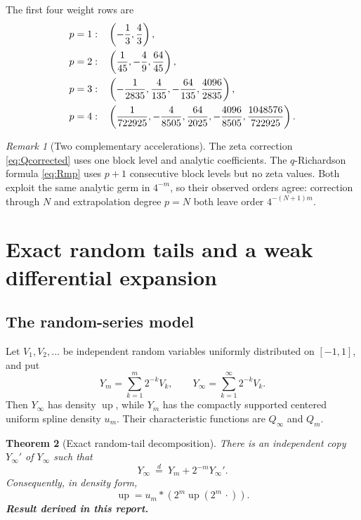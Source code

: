 \documentclass[11pt,oneside]{article}
\numberwithin{equation}{section}
\newtheorem{theorem}{Theorem}[section]
\theoremstyle{definition}
\theoremstyle{remark}
\newtheorem{remark}[theorem]{Remark}
\newcommand{\Up}{\operatorname{up}}
\newcommand{\newresult}{\textbf{Result derived in this report.}}
\begin{document}
The first four weight rows are
\begin{align}
 p=1:&\quad \left(-\frac13,\frac43\right),\notag\\
 p=2:&\quad \left(\frac1{45},-\frac49,\frac{64}{45}\right),\notag\\
 p=3:&\quad \left(-\frac1{2835},\frac4{135},-\frac{64}{135},\frac{4096}{2835}\right),
 \label{eq:weights-first}\\
 p=4:&\quad \left(\frac1{722925},-\frac4{8505},\frac{64}{2025},
 -\frac{4096}{8505},\frac{1048576}{722925}\right).\notag
\end{align}

\begin{remark}[Two complementary accelerations]
The zeta correction \eqref{eq:Qcorrected} uses one block level and analytic coefficients.
The $q$-Richardson formula \eqref{eq:Rmp} uses $p+1$ consecutive block levels but no zeta
values.  Both exploit the same analytic germ in $4^{-m}$, so their observed orders agree:
correction through $N$ and extrapolation degree $p=N$ both leave order $4^{-(N+1)m}$.
\end{remark}

\section{Exact random tails and a weak differential expansion}
\label{sec:probability}

\subsection{The random-series model}

Let $V_1,V_2,\ldots$ be independent random variables uniformly distributed on $[-1,1]$, and
put
\begin{equation}
 Y_m=\sum_{k=1}^{m}2^{-k}V_k,
 \qquad
 Y_\infty=\sum_{k=1}^{\infty}2^{-k}V_k.
 \label{eq:Ydef}
\end{equation}
Then $Y_\infty$ has density $\Up$, while $Y_m$ has the compactly supported centered uniform
spline density $u_m$.  Their characteristic functions are $Q_\infty$ and $Q_m$.

\begin{theorem}[Exact random-tail decomposition]
\label{thm:random-tail}
There is an independent copy $Y_\infty'$ of $Y_\infty$ such that
\begin{equation}
 \boxed{Y_\infty\ \stackrel{d}{=}\ Y_m+2^{-m}Y_\infty'.}
 \label{eq:random-tail}
\end{equation}
Consequently, in density form,
\begin{equation}
 \boxed{
 \Up=u_m*\left(2^m\Up(2^m\,\cdot)\right).}
 \label{eq:density-deconv}
\end{equation}
\newresult
\end{theorem}
\end{document}
